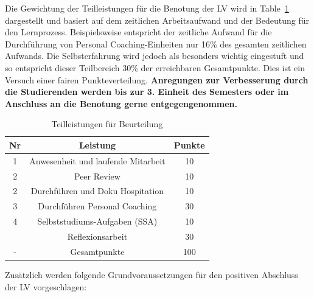 \documentclass[
  letterpaper,
  DIV=11,
  numbers=noendperiod]{scrreprt}
\begin{document}
Die Gewichtung der Teilleistungen für die Benotung der LV wird in
Table~\ref{tbl-Teilleistungen} dargestellt und basiert auf dem
zeitlichen Arbeitsaufwand und der Bedeutung für den Lernprozess.
Beispielsweise entspricht der zeitliche Aufwand für die Durchführung von
Personal Coaching-Einheiten nur 16\% des gesamten zeitlichen Aufwands.
Die Selbsterfahrung wird jedoch als besonders wichtig eingestuft und so
entspricht dieser Teilbereich 30\% der erreichbaren Gesamtpunkte. Dies
ist ein Versuch einer fairen Punkteverteilung. \textbf{Anregungen zur
Verbesserung durch die Studierenden werden bis zur 3. Einheit des
Semesters oder im Anschluss an die Benotung gerne entgegengenommen.}

\begingroup\fontsize{12}{14}\selectfont

\begin{longtable}[t]{ccc}

\caption{\label{tbl-Teilleistungen}Teilleistungen für Beurteilung}

\tabularnewline

\toprule
Nr & Leistung & Punkte\\
\midrule
1 & Anwesenheit und laufende Mitarbeit & 10\\
2 & Peer Review & 10\\
2 & Durchführen und Doku Hospitation & 10\\
3 & Durchführen Personal Coaching & 30\\
4 & Selbststudiums-Aufgaben (SSA) & 10\\
\addlinespace
5 & Reflexionsarbeit & 30\\
- & Gesamtpunkte & 100\\
\bottomrule

\end{longtable}

\endgroup{}

Zusätzlich werden folgende Grundvoraussetzungen für den positiven
Abschluss der LV vorgeschlagen:
\end{document}
